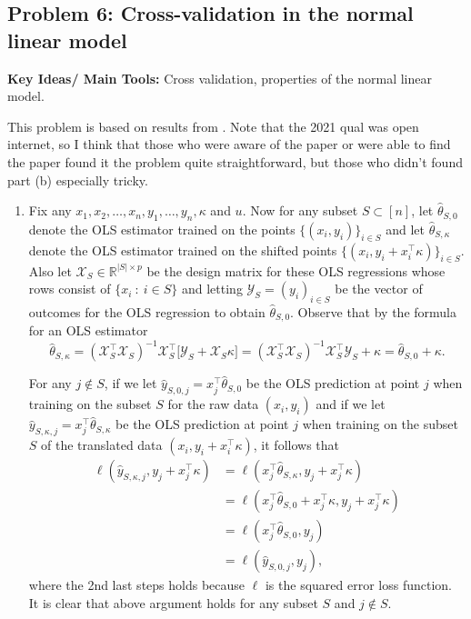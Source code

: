 \subsection*{Problem 6: Cross-validation in the normal linear model}

\textbf{Key Ideas/ Main Tools:} Cross validation, properties of the normal linear model.


This problem is based on results from \cite{Bates2022CrossVal}. Note that the 2021 qual was open internet, so I think that those who were aware of the paper or were able to find the paper found it the problem quite straightforward, but those who didn't found part (b) especially tricky.

\begin{enumerate}[label=(\alph*)]
\item Fix any $x_1,x_2, \dots,x_n, y_1,\dots,y_n, \kappa$ and $u$. Now for any subset $S \subset [n]$, let $\hat{\theta}_{S,0}$ denote the OLS estimator trained on the points $\{ (x_i,y_i) \}_{i \in S}$ and let $\hat{\theta}_{S,\kappa}$ denote the OLS estimator trained on the shifted points   $\{ (x_i,y_i +x_i^\top   \kappa) \}_{i \in S}$. Also let $\mathcal{X}_S \in \mathbb{R}^{\vert S \vert \times p}$ be the design matrix for these OLS regressions whose rows consist of $\{ x_i \ : \ i \in S \}$ and letting $\mathcal{Y}_S = (y_i )_{i \in S}$ be the vector of outcomes for the OLS regression to obtain $\hat{\theta}_{S,0}$. Observe that by the formula for an OLS estimator $$\hat{\theta}_{S,\kappa} = (\mathcal{X}_S^\top   \mathcal{X}_S)^{-1} \mathcal{X}_S^\top   \big[ \mathcal{Y}_S + \mathcal{X}_S \kappa \big] =  (\mathcal{X}_S^\top   \mathcal{X}_S)^{-1} \mathcal{X}_S^\top   \mathcal{Y}_S  + \kappa =\hat{\theta}_{S,0} +\kappa.$$

For any $j \notin S$, if we let $\hat{y}_{S,0,j} = x_j^\top   \hat{\theta}_{S,0}$ be the OLS prediction at point $j$ when training on the subset $S$ for the raw data $(x_i,y_i)$ and if we let $\hat{y}_{S,\kappa,j} = x_j^\top   \hat{\theta}_{S,\kappa}$ be the OLS prediction at point $j$ when training on the subset $S$ of the translated data $(x_i,y_i+x_i^\top   \kappa)$, it follows that 
\begin{align*}
    \ell(\hat{y}_{S,\kappa,j} , y_j +x_j^\top   \kappa)& =  \ell(x_j^\top   \hat{\theta}_{S,\kappa}, y_j +x_j^\top   \kappa)\\
    &= \ell(x_j^\top   \hat{\theta}_{S,0} +x_j^\top  \kappa, y_j +x_j^\top   \kappa)\\
    &  = \ell ( x_j^\top   \hat{\theta}_{S,0}, y_j)\\
    &=\ell(\hat{y}_{S,0,j},y_j),
\end{align*}
where the 2nd last steps holds because $\ell$ is the squared error loss function. It is clear that above argument holds for any subset $S$ and $j \notin S$. %


\end{enumerate}
